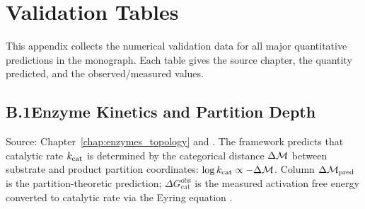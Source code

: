 
\chapter*{Validation Tables}
\label{app:validation}

This appendix collects the numerical validation data for all major quantitative
predictions in the monograph. Each table gives the source chapter, the quantity
predicted, and the observed/measured values.

\section*{B.1\quad Enzyme Kinetics and Partition Depth}
\label{app:enzyme_table}

\noindent
Source: Chapter~\ref{chap:enzymes_topology} and \citet{Sachikonye2025_Partition}.
The framework predicts that catalytic rate $k_{\mathrm{cat}}$ is determined by the
categorical distance $\Delta\mathcal{M}$ between substrate and product partition
coordinates: $\log k_{\mathrm{cat}} \propto -\Delta\mathcal{M}$. Column $\Delta\mathcal{M}_{\mathrm{pred}}$
is the partition-theoretic prediction; $\Delta G_{\mathrm{cat}}^{\mathrm{obs}}$
is the measured activation free energy converted to catalytic rate via the
Eyring equation \citep{eyring1935}.

\vspace{6pt}

